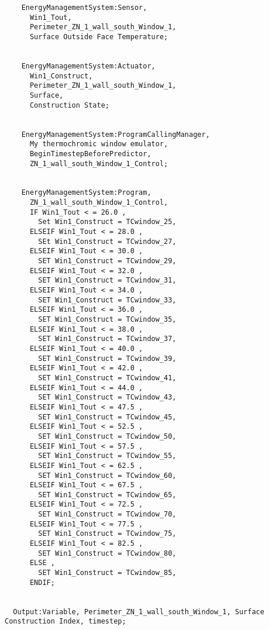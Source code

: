 \begin{lstlisting}
    EnergyManagementSystem:Sensor,
      Win1_Tout,
      Perimeter_ZN_1_wall_south_Window_1,
      Surface Outside Face Temperature;


    EnergyManagementSystem:Actuator,
      Win1_Construct,
      Perimeter_ZN_1_wall_south_Window_1,
      Surface,
      Construction State;


    EnergyManagementSystem:ProgramCallingManager,
      My thermochromic window emulator,
      BeginTimestepBeforePredictor,
      ZN_1_wall_south_Window_1_Control;


    EnergyManagementSystem:Program,
      ZN_1_wall_south_Window_1_Control,
      IF Win1_Tout < = 26.0 ,
        Set Win1_Construct = TCwindow_25,
      ELSEIF Win1_Tout < = 28.0 ,
        SEt Win1_Construct = TCwindow_27,
      ELSEIF Win1_Tout < = 30.0 ,
        SET Win1_Construct = TCwindow_29,
      ELSEIF Win1_Tout < = 32.0 ,
        SET Win1_Construct = TCwindow_31,
      ELSEIF Win1_Tout < = 34.0 ,
        SET Win1_Construct = TCwindow_33,
      ELSEIF Win1_Tout < = 36.0 ,
        SET Win1_Construct = TCwindow_35,
      ELSEIF Win1_Tout < = 38.0 ,
        SET Win1_Construct = TCwindow_37,
      ELSEIF Win1_Tout < = 40.0 ,
        SET Win1_Construct = TCwindow_39,
      ELSEIF Win1_Tout < = 42.0 ,
        SET Win1_Construct = TCwindow_41,
      ELSEIF Win1_Tout < = 44.0 ,
        SET Win1_Construct = TCwindow_43,
      ELSEIF Win1_Tout < = 47.5 ,
        SET Win1_Construct = TCwindow_45,
      ELSEIF Win1_Tout < = 52.5 ,
        SET Win1_Construct = TCwindow_50,
      ELSEIF Win1_Tout < = 57.5 ,
        SET Win1_Construct = TCwindow_55,
      ELSEIF Win1_Tout < = 62.5 ,
        SET Win1_Construct = TCwindow_60,
      ELSEIF Win1_Tout < = 67.5 ,
        SET Win1_Construct = TCwindow_65,
      ELSEIF Win1_Tout < = 72.5 ,
        SET Win1_Construct = TCwindow_70,
      ELSEIF Win1_Tout < = 77.5 ,
        SET Win1_Construct = TCwindow_75,
      ELSEIF Win1_Tout < = 82.5 ,
        SET Win1_Construct = TCwindow_80,
      ELSE ,
        SET Win1_Construct = TCwindow_85,
      ENDIF;


  Output:Variable, Perimeter_ZN_1_wall_south_Window_1, Surface Construction Index, timestep;
\end{lstlisting}
